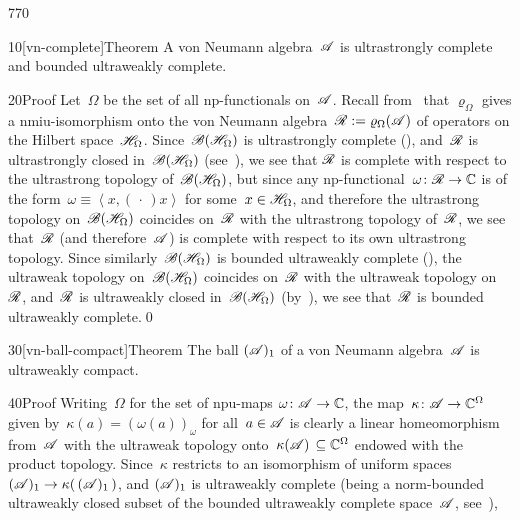 \begin{parsec}{770}%
\begin{point}{10}[vn-complete]{Theorem}%
A von Neumann algebra~$\mathscr{A}$ is ultrastrongly complete
and bounded ultraweakly complete.
\begin{point}{20}{Proof}%
Let~$\Omega$ be the set of all np-functionals
on~$\mathscr{A}$.
Recall from~
that $\varrho_\Omega$
gives a nmiu-isomorphism
onto the 
von Neumann algebra~$\mathscr{R}:=\varrho_\Omega(\mathscr{A})$ of operators
on the Hilbert space~$\mathscr{H}_\Omega$.
Since~$\mathscr{B}(\mathscr{H}_\Omega)$ is ultrastrongly complete
(),
and~$\mathscr{R}$ is  ultrastrongly closed in~$\mathscr{B}(\mathscr{H}_\Omega)$
(see~),
we see that $\mathscr{R}$
is complete with respect to the ultrastrong
topology of~$\mathscr{B}(\mathscr{H}_\Omega)$,
but since any np-functional~$\omega\colon \mathscr{R}\to\mathbb{C}$
is of the form~$\omega\equiv \left<x,(\,\cdot\,)x\right>$
for some~$x\in\mathscr{H}_\Omega$,
and therefore  the ultrastrong topology on~$\mathscr{B}(\mathscr{H}_\Omega)$
coincides on~$\mathscr{R}$ with the ultrastrong topology of~$\mathscr{R}$,
we see that~$\mathscr{R}$ (and therefore~$\mathscr{A}$)
is complete with respect to its own ultrastrong topology.
Since similarly~$\mathscr{B}(\mathscr{H}_\Omega)$
is bounded ultraweakly complete (),
the ultraweak topology on~$\mathscr{B}(\mathscr{H}_\Omega)$
coincides on~$\mathscr{R}$ with the ultraweak topology on~$\mathscr{R}$,
and~$\mathscr{R}$ is ultraweakly closed
in~$\mathscr{B}(\mathscr{H}_\Omega)$
(by~),
we see that~$\mathscr{R}$ is bounded ultraweakly complete.\qed
\end{point}
\end{point}
\begin{point}{30}[vn-ball-compact]{Theorem}%
The ball $(\mathscr{A})_1$
of a von Neumann algebra~$\mathscr{A}$ is ultraweakly compact.
\begin{point}{40}{Proof}%
Writing~$\Omega$ for
the set of npu-maps $\omega\colon \mathscr{A}\to\mathbb{C}$,
the map~$\kappa\colon \mathscr{A}\to \mathbb{C}^\Omega$
given by~$\kappa(a)=(\omega(a))_\omega$ for all~$a\in\mathscr{A}$
is clearly a linear homeomorphism from~$\mathscr{A}$ with the  ultraweak topology 
onto~$\kappa(\mathscr{A})\,\subseteq \mathbb{C}^\Omega$ endowed
with the product topology.
Since~$\kappa$ restricts
to an isomorphism of uniform spaces
$(\mathscr{A})_1\to \kappa(\,(\mathscr{A})_1\,)$,
and $(\mathscr{A})_1$ is ultraweakly complete 
(being a norm-bounded ultraweakly closed
subset of the bounded ultraweakly complete space~$\mathscr{A}$,
see~),

\end{point}
\end{point}
\end{parsec}
